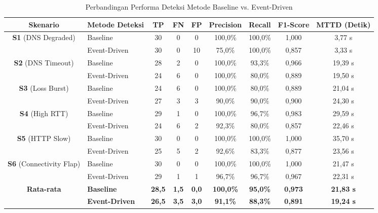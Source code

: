 \begin{table}[t]
\caption{Perbandingan Performa Deteksi Metode Baseline vs. Event-Driven}
\label{tab-performa-deteksi}
\centering
\begin{tabular}{clccccccc}
\toprule
\textbf{Skenario} & \textbf{Metode Deteksi} & \textbf{TP} & \textbf{FN} & \textbf{FP} & \textbf{Precision} & \textbf{Recall} & \textbf{F1-Score} & \textbf{MTTD (Detik)} \\
\midrule
\multirow{2}{*}{\textbf{S1} (DNS Degraded)} & Baseline & 30 & 0 & 0 & 100,0\% & 100,0\% & 1,000 & 3,77 s \\
 & Event-Driven & 30 & 0 & 10 & 75,0\% & 100,0\% & 0,857 & 3,33 s \\
\hline
\multirow{2}{*}{\textbf{S2} (DNS Timeout)} & Baseline & 28 & 2 & 0 & 100,0\% & 93,3\% & 0,966 & 19,39 s \\
 & Event-Driven & 24 & 6 & 0 & 100,0\% & 80,0\% & 0,889 & 19,50 s \\
\hline
\multirow{2}{*}{\textbf{S3} (Loss Burst)} & Baseline & 24 & 6 & 0 & 100,0\% & 80,0\% & 0,889 & 21,04 s \\
 & Event-Driven & 27 & 3 & 3 & 90,0\% & 90,0\% & 0,900 & 24,30 s \\
\hline
\multirow{2}{*}{\textbf{S4} (High RTT)} & Baseline & 29 & 1 & 0 & 100,0\% & 96,7\% & 0,983 & 29,59 s \\
 & Event-Driven & 24 & 6 & 2 & 92,3\% & 80,0\% & 0,857 & 22,46 s \\
\hline
\multirow{2}{*}{\textbf{S5} (HTTP Slow)} & Baseline & 30 & 0 & 0 & 100,0\% & 100,0\% & 1,000 & 35,70 s \\
 & Event-Driven & 25 & 5 & 2 & 92,6\% & 83,3\% & 0,877 & 23,56 s \\
\hline
\multirow{2}{*}{\textbf{S6} (Connectivity Flap)} & Baseline & 30 & 0 & 0 & 100,0\% & 100,0\% & 1,000 & 21,47 s \\
 & Event-Driven & 29 & 1 & 1 & 96,7\% & 96,7\% & 0,967 & 22,31 s \\
\hline
\multirow{2}{*}{\textbf{Rata-rata}} & \textbf{Baseline} & \textbf{28,5} & \textbf{1,5} & \textbf{0,0} & \textbf{100,0\%} & \textbf{95,0\%} & \textbf{0,973} & \textbf{21,83 s} \\
 & \textbf{Event-Driven} & \textbf{26,5} & \textbf{3,5} & \textbf{3,0} & \textbf{91,1\%} & \textbf{88,3\%} & \textbf{0,891} & \textbf{19,24 s} \\
\bottomrule
\end{tabular}
\end{table}


